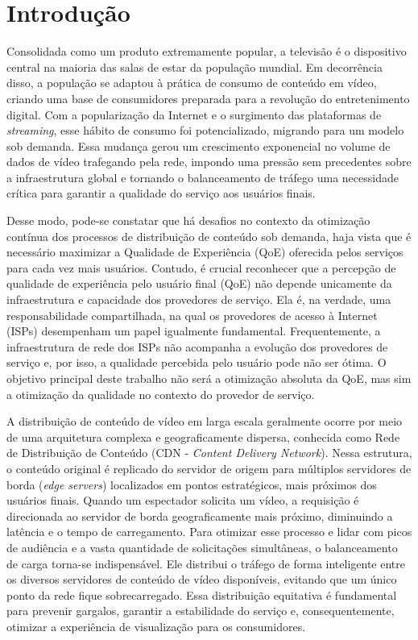 
\chapter{Introdução}

Consolidada como um produto extremamente popular, a televisão é o dispositivo central na maioria das salas de estar da população mundial. Em decorrência disso, a população se adaptou à prática de consumo de conteúdo em vídeo, criando uma base de consumidores preparada para a revolução do entretenimento digital. Com a popularização da Internet e o surgimento das plataformas de \textit{streaming}, esse hábito de consumo foi potencializado, migrando para um modelo sob demanda. Essa mudança gerou um crescimento exponencial no volume de dados de vídeo trafegando pela rede, impondo uma pressão sem precedentes sobre a infraestrutura global e tornando o balanceamento de tráfego uma necessidade crítica para garantir a qualidade do serviço aos usuários finais.

Desse modo, pode-se constatar que há desafios no contexto da otimização contínua dos processos de distribuição de conteúdo sob demanda, haja vista que é necessário maximizar a Qualidade de Experiência (QoE) oferecida pelos serviços para cada vez mais usuários. Contudo, é crucial reconhecer que a percepção de qualidade de experiência pelo usuário final (QoE) não depende unicamente da infraestrutura e capacidade dos provedores de serviço. Ela é, na verdade, uma responsabilidade compartilhada, na qual os provedores de acesso à Internet (ISPs) desempenham um papel igualmente fundamental. Frequentemente, a infraestrutura de rede dos ISPs não acompanha a evolução dos provedores de serviço e, por isso, a qualidade percebida pelo usuário pode não ser ótima. O objetivo principal deste trabalho não será a otimização absoluta da QoE, mas sim a otimização da qualidade no contexto do provedor de serviço.

A distribuição de conteúdo de vídeo em larga escala geralmente ocorre por meio de uma arquitetura complexa e geograficamente dispersa, conhecida como Rede de Distribuição de Conteúdo (CDN - \textit{Content Delivery Network}). Nessa estrutura, o conteúdo original é replicado do servidor de origem para múltiplos servidores de borda (\textit{edge servers}) localizados em pontos estratégicos, mais próximos dos usuários finais. Quando um espectador solicita um vídeo, a requisição é direcionada ao servidor de borda geograficamente mais próximo, diminuindo a latência e o tempo de carregamento. Para otimizar esse processo e lidar com picos de audiência e a vasta quantidade de solicitações simultâneas, o balanceamento de carga torna-se indispensável. Ele distribui o tráfego de forma inteligente entre os diversos servidores de conteúdo de vídeo disponíveis, evitando que um único ponto da rede fique sobrecarregado. Essa distribuição equitativa é fundamental para prevenir gargalos, garantir a estabilidade do serviço e, consequentemente, otimizar a experiência de visualização para os consumidores.

